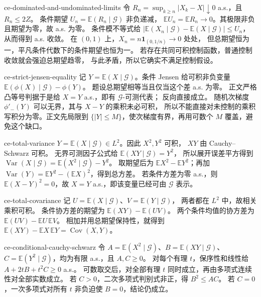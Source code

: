 \begin{solution}{ce-dominated-and-undominated-limits}
令 $R_n=\sup_{k\ge n}|X_k-X|\downarrow0$ a.s.，且 $R_n\le2Z$。
条件期望 $U_n=\mathbb E(R_n\mid\mathcal G)$ 非负递减，
$\mathbb EU_n=\mathbb ER_n\to0$。其极限非负且期望为零，故 a.s. 为零。
条件模不等式给
$|\mathbb E(X_n\mid\mathcal G)-\mathbb E(X\mid\mathcal G)|\le U_n$，
从而得到 a.s. 收敛。
在 $(0,1)$ 上，$X_n=n\mathbf1_{(0,1/n)}\to0$ 处处，
但总期望恒为一，平凡条件代数下的条件期望也恒为一。
若存在共同可积控制函数，普通控制收敛就会强迫总期望趋零，
与此矛盾，所以它确实不满足控制假设。
\end{solution}

\begin{solution}{ce-strict-jensen-equality}
记 $Y=\mathbb E(X\mid\mathcal G)$。条件 Jensen 给可积非负变量
$\mathbb E(\phi(X)\mid\mathcal G)-\phi(Y)$。
题设总期望相等当且仅当这个差 a.s. 为零。
正文严格凸等号判据于是给 $X=Y$ a.s.，即有 $\mathcal G$-可测代表；
反向直接成立。
随机次梯度 $\phi'_-(Y)$ 可以无界，其与 $X-Y$ 的乘积未必可积，
所以不能直接对未控制的乘积写积分为零。正文先局限到
$\{|Y|\le M\}$，使次梯度有界，再用可数个 $M$ 覆盖，避免这个缺口。
\end{solution}

\begin{solution}{ce-total-variance}
$Y=\mathbb E(X\mid\mathcal G)\in L^2$。因此 $X^2,Y^2$ 可积，
$XY$ 由 Cauchy--Schwarz 可积。
无界可测因子公式给 $\mathbb E(XY\mid\mathcal G)=Y^2$，
所以展开误差平方得到
$\operatorname{Var}(X\mid\mathcal G)=\mathbb E(X^2\mid\mathcal G)-Y^2$。
取期望后为 $\mathbb EX^2-\mathbb EY^2$；再加
$\operatorname{Var}(Y)=\mathbb EY^2-(\mathbb EX)^2$，得到总方差。
若条件方差为零 a.s.，则
$\mathbb E(X-Y)^2=0$，故 $X=Y$ a.s.，即该变量已经可由 $\mathcal G$ 表示。
\end{solution}

\begin{solution}{ce-total-covariance}
记 $U=\mathbb E(X\mid\mathcal G)$、$V=\mathbb E(Y\mid\mathcal G)$，
两者都在 $L^2$ 中，故相关乘积可积。
条件协方差的期望为 $\mathbb E(XY)-\mathbb E(UV)$。
两个条件均值的协方差为
$\mathbb E(UV)-\mathbb EU\,\mathbb EV$。
相加并用总期望保持性，就得到
$\mathbb E(XY)-\mathbb EX\,\mathbb EY=\operatorname{Cov}(X,Y)$。
\end{solution}

\begin{solution}{ce-conditional-cauchy-schwarz}
令 $A=\mathbb E(X^2\mid\mathcal G)$、$B=\mathbb E(XY\mid\mathcal G)$、
$C=\mathbb E(Y^2\mid\mathcal G)$，均为有限 a.s.，且 $A,C\ge0$。
对每个有理 $t$，保序性和线性给 $A+2tB+t^2C\ge0$ a.s.。
可数取交后，对全部有理 $t$ 同时成立，再由多项式连续性对全部实数成立。
若 $C>0$，二次多项式判别式非正，得 $B^2\le AC$。
若 $C=0$，一次多项式对所有 $t$ 非负迫使 $B=0$，结论仍成立。
\end{solution}

